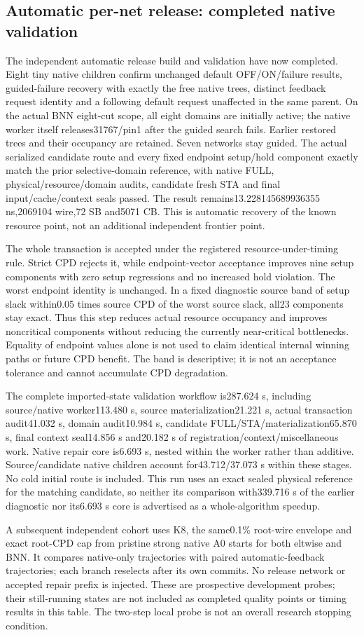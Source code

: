 \subsection{Automatic per-net release: completed native validation}
The independent automatic release build and validation have now completed. Eight tiny native children confirm unchanged default OFF/ON/failure results, guided-failure recovery with exactly the free native trees, distinct feedback request identity and a following default request unaffected in the same parent. On the actual BNN eight-cut scope, all eight domains are initially active; the native worker itself releases31767/pin1 after the guided search fails. Earlier restored trees and their occupancy are retained. Seven networks stay guided. The actual serialized candidate route and every fixed endpoint setup/hold component exactly match the prior selective-domain reference, with native FULL, physical/resource/domain audits, candidate fresh STA and final input/cache/context seals passed. The result remains13.228145689936355 ns,2069104 wire,72 SB and5071 CB. This is automatic recovery of the known resource point, not an additional independent frontier point.

The whole transaction is accepted under the registered resource-under-timing rule. Strict CPD rejects it, while endpoint-vector acceptance improves nine setup components with zero setup regressions and no increased hold violation. The worst endpoint identity is unchanged. In a fixed diagnostic source band of setup slack within0.05 times source CPD of the worst source slack, all23 components stay exact. Thus this step reduces actual resource occupancy and improves noncritical components without reducing the currently near-critical bottlenecks. Equality of endpoint values alone is not used to claim identical internal winning paths or future CPD benefit. The band is descriptive; it is not an acceptance tolerance and cannot accumulate CPD degradation.

The complete imported-state validation workflow is287.624 s, including source/native worker113.480 s, source materialization21.221 s, actual transaction audit41.032 s, domain audit10.984 s, candidate FULL/STA/materialization65.870 s, final context seal14.856 s and20.182 s of registration/context/miscellaneous work. Native repair core is6.693 s, nested within the worker rather than additive. Source/candidate native children account for43.712/37.073 s within these stages. No cold initial route is included. This run uses an exact sealed physical reference for the matching candidate, so neither its comparison with339.716 s of the earlier diagnostic nor its6.693 s core is advertised as a whole-algorithm speedup.

A subsequent independent cohort uses K8, the same0.1\% root-wire envelope and exact root-CPD cap from pristine strong native A0 starts for both eltwise and BNN. It compares native-only trajectories with paired automatic-feedback trajectories; each branch reselects after its own commits. No release network or accepted repair prefix is injected. These are prospective development probes; their still-running states are not included as completed quality points or timing results in this table. The two-step local probe is not an overall research stopping condition.
